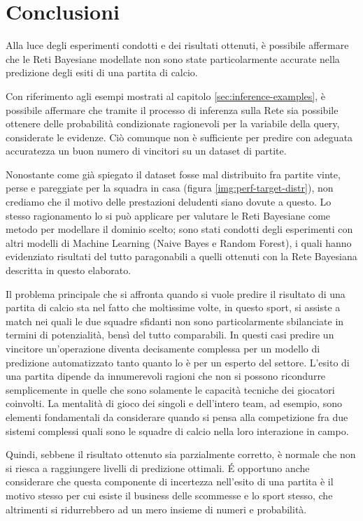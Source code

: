 \documentclass[hidelinks, 12pt]{article}
\begin{document}
\clearpage



\section{Conclusioni}

Alla luce degli esperimenti condotti e dei risultati ottenuti, è possibile affermare che le Reti Bayesiane modellate non sono state particolarmente accurate nella predizione degli esiti di una partita di calcio.

Con riferimento agli esempi mostrati al capitolo \ref{sec:inference-examples}, è possibile affermare che tramite il processo di inferenza sulla Rete sia possibile ottenere delle probabilità condizionate ragionevoli per la variabile della query, considerate le evidenze. Ciò comunque non è sufficiente per predire con adeguata accuratezza un buon numero di vincitori su un dataset di partite.

Nonostante come già spiegato il dataset fosse mal distribuito fra partite vinte, perse e pareggiate per la squadra in casa (figura \ref{img:perf-target-distr}), non crediamo che il motivo delle prestazioni deludenti siano dovute a questo. Lo stesso ragionamento lo si può applicare per valutare le Reti Bayesiane come metodo per modellare il dominio scelto; sono stati condotti degli esperimenti con altri modelli di Machine Learning (Naive Bayes e Random Forest), i quali hanno evidenziato risultati del tutto paragonabili a quelli ottenuti con la Rete Bayesiana descritta in questo elaborato.

Il problema principale che si affronta quando si vuole predire il risultato di una partita di calcio sta nel fatto che moltissime volte, in questo sport, si assiste a match nei quali le due squadre sfidanti non sono particolarmente sbilanciate in termini di potenzialità, bensì del tutto comparabili. In questi casi predire un vincitore un'operazione diventa decisamente complessa per un modello di predizione automatizzato tanto quanto lo è per un esperto del settore. L'esito di una partita dipende da innumerevoli ragioni che non si possono ricondurre semplicemente in quelle che sono solamente le capacità tecniche dei giocatori coinvolti. La mentalità di gioco dei singoli e dell'intero team, ad esempio, sono elementi fondamentali da considerare quando si pensa alla competizione fra due sistemi complessi quali sono le squadre di calcio nella loro interazione in campo.

Quindi, sebbene il risultato ottenuto sia parzialmente corretto, è normale che non si riesca a raggiungere livelli di predizione ottimali. É opportuno anche considerare che questa componente di incertezza nell'esito di una partita è il motivo stesso per cui esiste il business delle scommesse e lo sport stesso, che altrimenti si ridurrebbero ad un mero insieme di numeri e probabilità.




\newpage


	
\end{document}
